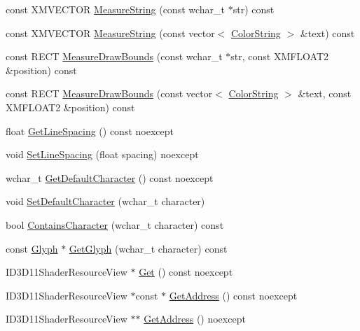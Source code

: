 \begin{DoxyCompactItemize}
\item 
const X\+M\+V\+E\+C\+T\+OR \hyperlink{classmage_1_1_sprite_font_af8d3b1e3f9cbda7d3f1c5ab95100dae7}{Measure\+String} (const wchar\+\_\+t $\ast$str) const
\item 
const X\+M\+V\+E\+C\+T\+OR \hyperlink{classmage_1_1_sprite_font_a17416e00488252cfda8778265a6f2be9}{Measure\+String} (const vector$<$ \hyperlink{structmage_1_1_color_string}{Color\+String} $>$ \&text) const
\item 
const R\+E\+CT \hyperlink{classmage_1_1_sprite_font_a80e5f0cdbb424754a0fb8239103d0f26}{Measure\+Draw\+Bounds} (const wchar\+\_\+t $\ast$str, const X\+M\+F\+L\+O\+A\+T2 \&position) const
\item 
const R\+E\+CT \hyperlink{classmage_1_1_sprite_font_a7204248284cf5f158c16794f6c6fa253}{Measure\+Draw\+Bounds} (const vector$<$ \hyperlink{structmage_1_1_color_string}{Color\+String} $>$ \&text, const X\+M\+F\+L\+O\+A\+T2 \&position) const
\item 
float \hyperlink{classmage_1_1_sprite_font_a281f33047c7627053a5bf61f8fa704fe}{Get\+Line\+Spacing} () const noexcept
\item 
void \hyperlink{classmage_1_1_sprite_font_adeaa2852ec0c8ce3817f0f69663f0a35}{Set\+Line\+Spacing} (float spacing) noexcept
\item 
wchar\+\_\+t \hyperlink{classmage_1_1_sprite_font_a9be513809e714558708cab21a22d7316}{Get\+Default\+Character} () const noexcept
\item 
void \hyperlink{classmage_1_1_sprite_font_a0b0feb25673d6f9d9e3215167800d817}{Set\+Default\+Character} (wchar\+\_\+t character)
\item 
bool \hyperlink{classmage_1_1_sprite_font_a01836c4197661dbdd66c624d8dc6a7c3}{Contains\+Character} (wchar\+\_\+t character) const
\item 
const \hyperlink{structmage_1_1_glyph}{Glyph} $\ast$ \hyperlink{classmage_1_1_sprite_font_aa13424a1e0153ffb9433bb2cb416360b}{Get\+Glyph} (wchar\+\_\+t character) const
\item 
I\+D3\+D11\+Shader\+Resource\+View $\ast$ \hyperlink{classmage_1_1_sprite_font_a8e43f8d97fb7e5ee03ed49fb45ee1b5f}{Get} () const noexcept
\item 
I\+D3\+D11\+Shader\+Resource\+View $\ast$const  $\ast$ \hyperlink{classmage_1_1_sprite_font_a7bb83a23e33270c1c47c58eb67f048d1}{Get\+Address} () const noexcept
\item 
I\+D3\+D11\+Shader\+Resource\+View $\ast$$\ast$ \hyperlink{classmage_1_1_sprite_font_a6adc948fa1132f68b0f835e1453e37f7}{Get\+Address} () noexcept
\end{DoxyCompactItemize}
